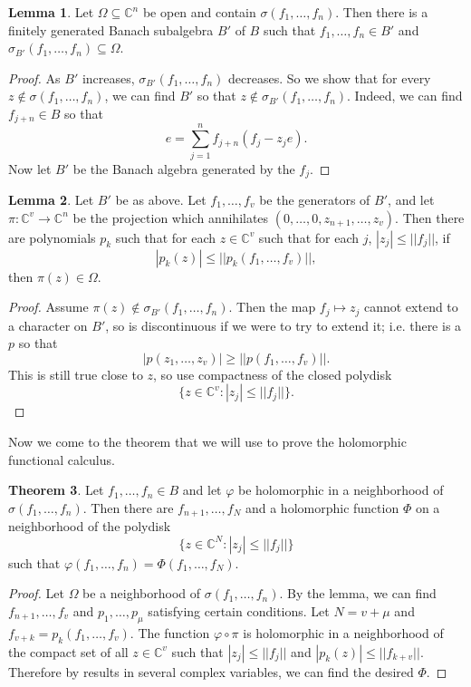 \documentclass[12pt]{report}
\newcommand{\CC}{\mathbb{C}}
\theoremstyle{definition}
\newtheorem{theorem}{Theorem}[chapter]
\newtheorem{lemma}[theorem]{Lemma}
\begin{document}
\begin{lemma}
    Let $\Omega \subseteq \CC^n$ be open and contain $\sigma(f_1, \dots, f_n)$. Then there is a finitely generated Banach subalgebra $B'$ of $B$ such that $f_1, \dots, f_n \in B'$ and $\sigma_{B'}(f_1, \dots, f_n) \subseteq \Omega$.
\end{lemma}
\begin{proof}
    As $B'$ increases, $\sigma_{B'}(f_1, \dots, f_n)$ decreases. So we show that for every $z \notin \sigma(f_1, \dots, f_n)$, we can find $B'$ so that $z \notin \sigma_{B'}(f_1, \dots, f_n)$. Indeed, we can find $f_{j+n} \in B$ so that
    $$e = \sum_{j=1}^n f_{j+n}(f_j - z_je).$$
    Now let $B'$ be the Banach algebra generated by the $f_j$.
\end{proof}
\begin{lemma}
    Let $B'$ be as above. Let $f_1, \dots, f_v$ be the generators of $B'$, and let $\pi: \CC^v \to \CC^n$ be the projection which annihilates $(0, \dots, 0, z_{n+1}, \dots, z_v)$. Then there are polynomials $p_k$ such that for each $z \in \CC^v$ such that for each $j$, $|z_j| \leq ||f_j||$, if
    $$|p_k(z)| \leq ||p_k(f_1, \dots, f_v)||,$$
    then $\pi(z) \in \Omega$.
\end{lemma}
\begin{proof}
    Assume $\pi(z) \notin \sigma_{B'}(f_1, \dots, f_n)$. Then the map $f_j \mapsto z_j$ cannot extend to a character on $B'$, so is discontinuous if we were to try to extend it; i.e. there is a $p$ so that
    $$|p(z_1, \dots, z_v)| \geq ||p(f_1, \dots, f_v)||.$$
    This is still true close to $z$, so use compactness of the closed polydisk
    $$\{z \in \CC^v: |z_j| \leq ||f_j||\}.$$
\end{proof}
    Now we come to the theorem that we will use to prove the holomorphic functional calculus.
\begin{theorem}
    Let $f_1, \dots, f_n \in B$ and let $\varphi$ be holomorphic in a neighborhood of $\sigma(f_1, \dots, f_n)$. Then there are $f_{n+1}, \dots, f_N$ and a holomorphic function $\Phi$ on a neighborhood of the polydisk
    $$\{z \in \CC^N: |z_j| \leq ||f_j||\}$$
    such that $\varphi(f_1, \dots, f_n) = \Phi(f_1, \dots, f_N)$.
\end{theorem}
\begin{proof}
    Let $\Omega$ be a neighborhood of $\sigma(f_1, \dots, f_n)$. By the lemma, we can find $f_{n+1}, \dots, f_v$ and $p_1, \dots, p_\mu$ satisfying certain conditions. Let $N = v + \mu$ and $f_{v+k} = p_k(f_1, \dots, f_v)$. The function $\varphi \circ \pi$ is holomorphic in a neighborhood of the compact set of all $z \in \CC^v$ such that $|z_j| \leq ||f_j||$ and $|p_k(z)| \leq ||f_{k+v}||$. Therefore by results in several complex variables, we can find the desired $\Phi$.
\end{proof}
\end{document}
